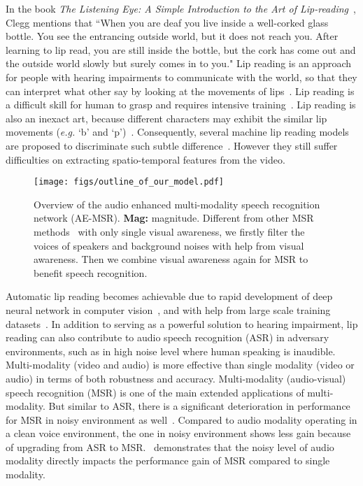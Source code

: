 \documentclass[10pt,twocolumn,letterpaper]{article}
\begin{document}
In the book \emph{The Listening Eye: A Simple Introduction to the Art of Lip-reading}~\cite{clegg1953listening}, Clegg mentions that ``When you are deaf you live inside a well-corked glass bottle. You see the entrancing outside world, but it does not reach you. After learning to lip read, you are still inside the bottle, but the cork has come out and the outside world slowly but surely comes in to you."
Lip reading is an approach for people with hearing impairments to communicate with the world, so that they can interpret what other say by looking at the movements of lips~\cite{assael2016lipnet,chung2016out,fisher1968confusions,mcgurk1976hearing,woodward1960phoneme}. Lip reading is a difficult skill for human to grasp and requires intensive training~\cite{easton1982perceptual,stafylakis2017combining}. Lip reading is also an inexact art, because different characters may exhibit the similar lip movements (\emph{e.g.} `b' and `p')~\cite{Triantafyllos-avsr2018}. Consequently, several machine lip reading models are proposed to discriminate such subtle difference~\cite{cooke2006audio,kumar2007profile,petajan1985automatic}. However they still suffer difficulties on extracting spatio-temporal features from the video.

\begin{figure}[t]
\centering
\texttt{[image: figs/outline\_of\_our\_model.pdf]}
\caption{Overview of the audio enhanced multi-modality speech recognition network (AE-MSR). {\bf Mag:} magnitude. Different from other MSR methods~\cite{Triantafyllos-avsr2018,chung2017lip,yang2019lrw,stafylakis2017combining,petridis2018end} with only single visual awareness, we firstly filter the voices of speakers and background noises with help from visual awareness. Then we combine visual awareness again for MSR to benefit speech recognition.}
\label{fig:long}
\label{fig:onecol}
\end{figure}
Automatic lip reading becomes achievable due to rapid development of deep neural network in computer vision~\cite{krizhevsky2012imagenet,simonyan2014very,szegedy2015going}, and with help from large scale training datasets~\cite{chung2017lip,chung2016lip,cooke2006audio,czyzewski2017audio,russakovsky2015imagenet,yang2019lrw}. In addition to serving as a powerful solution to hearing impairment, lip reading can also contribute to audio speech recognition (ASR) in adversary environments, such as in high noise level where human speaking is inaudible. Multi-modality (video and audio) is more effective than single modality (video or audio) in terms of both robustness and accuracy. Multi-modality (audio-visual) speech recognition (MSR) is one of the main extended applications of multi-modality. But similar to ASR, there is a significant deterioration in performance for MSR in noisy environment as well~\cite{Triantafyllos-avsr2018}. Compared to audio modality operating in a clean voice environment, the one in noisy environment shows less gain because of upgrading from ASR to MSR.~\cite{Triantafyllos-avsr2018} demonstrates that the noisy level of audio modality directly impacts the performance gain of MSR compared to single modality.
\end{document}
